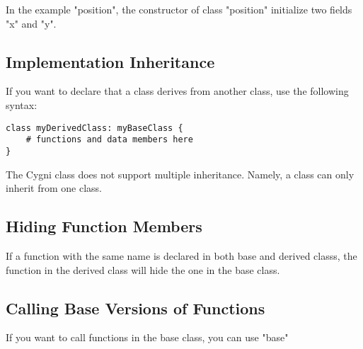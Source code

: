In the example "position", the constructor of class "position" initialize two fields "x" and "y".

\subsection{Implementation Inheritance}
If you want to declare that a class derives from another class, use the following syntax:

\begin{lstlisting}
class myDerivedClass: myBaseClass {
	# functions and data members here
}
\end{lstlisting} 

The Cygni class does not support multiple inheritance. Namely, a class can only inherit from one class.

\subsection{Hiding Function Members}
If a function with the same name is declared in both base and derived classs, the function in the derived class will hide the one in the base class.


\subsection{Calling Base Versions of Functions}
If you want to call functions in the base class, you can use "base" 

